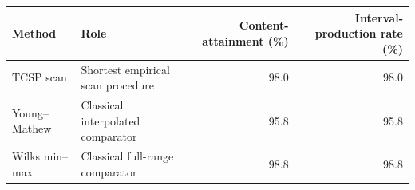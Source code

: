 \begin{tabularx}{\textwidth}{@{}l>{\raggedright\arraybackslash}Xrr@{}}
\toprule
Method & Role & Content-attainment (\%) & Interval-production rate (\%)\\
\midrule
TCSP scan & Shortest empirical scan procedure & 98.0 & 98.0 \\
Young--Mathew & Classical interpolated comparator & 95.8 & 95.8 \\
Wilks min--max & Classical full-range comparator & 98.8 & 98.8 \\
\bottomrule
\end{tabularx}
